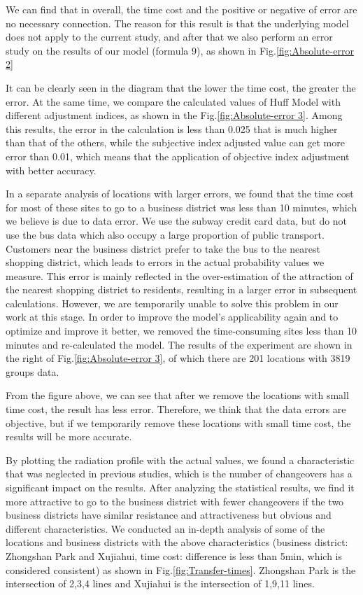 \documentclass[journal,transmag]{IEEEtran}
\begin{document}
We can find that in overall, the time cost and the positive or negative of error are no necessary connection. The reason for this result is that the underlying model does not apply to the current study, and after that we also perform an error study on the results of our model (formula 9), as shown in Fig.\ref{fig:Absolute-error 2}

It can be clearly seen in the diagram that the lower the time cost, the greater the error. At the same time, we compare the calculated values of Huff Model with different adjustment indices, as shown in the Fig.\ref{fig:Absolute-error 3}. Among this results, the error in the calculation is less than 0.025 that is much higher than that of the others, while the subjective index adjusted value can get more error than 0.01, which means that the application of objective index adjustment with better accuracy.

In a separate analysis of locations with larger errors, we found that the time cost for most of these sites to go to a business district was less than 10 minutes, which we believe is due to data error. We use the subway credit card data, but do not use the bus data which also occupy a large proportion of public transport. Customers near the business district prefer to take the bus to the nearest shopping district, which leads to errors in the actual probability values we measure. This error is mainly reflected in the over-estimation of the attraction of the nearest shopping district to residents, resulting in a larger error in subsequent calculations. However, we are temporarily unable to solve this problem in our work at this stage. In order to improve the model's applicability again and to optimize and improve it better, we removed the time-consuming sites less than 10 minutes and re-calculated the model. The results of the experiment are shown in the right of Fig.\ref{fig:Absolute-error 3}, of which there are 201 locations with 3819 groups data.

From the figure above, we can see that after we remove the locations with small time cost, the result has less error. Therefore, we think that the data errors are objective, but if we temporarily remove these locations with small time cost, the results will be more accurate.

By plotting the radiation profile with the actual values, we found a characteristic that was neglected in previous studies, which is the number of changeovers has a significant impact on the results. After analyzing the statistical results, we find it more attractive to go to the business district with fewer changeovers if the two business districts have similar resistance and attractiveness but obvious and different characteristics. We conducted an in-depth analysis of some of the locations and business districts with the above characteristics (business district: Zhongshan Park and Xujiahui, time cost: difference is less than 5min, which is considered consistent) as shown in Fig.\ref{fig:Transfer-times}. Zhongshan Park is the intersection of 2,3,4 lines and Xujiahui is the intersection of 1,9,11 lines.
\end{document}
